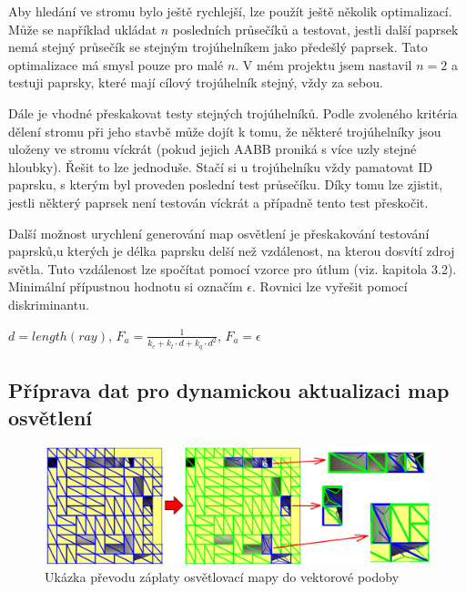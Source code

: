 \documentclass[11pt,twoside,a4paper]{book}
\begin{document}
Aby hledání ve stromu bylo ještě rychlejší, lze použít ještě několik optimalizací. Může se například ukládat $n$ posledních průsečíků a testovat, jestli další paprsek nemá stejný průsečík se stejným trojúhelníkem jako předešlý paprsek. Tato optimalizace má smysl pouze pro malé $n$. V mém projektu jsem nastavil $n = 2$ a testuji paprsky, které mají cílový trojúhelník stejný, vždy za sebou.

Dále je vhodné přeskakovat testy stejných trojúhelníků. Podle zvoleného kritéria dělení stromu při jeho stavbě může dojít k tomu, že některé trojúhelníky jsou uloženy ve stromu víckrát (pokud jejich AABB proniká s více uzly stejné hloubky). Řešit to lze jednoduše. Stačí si u trojúhelníku vždy pamatovat ID paprsku, s kterým byl proveden poslední test průsečíku. Díky tomu lze zjistit, jestli některý paprsek není testován víckrát a případně tento test přeskočit.

Další možnost urychlení generování map osvětlení je přeskakování testování paprsků,\linebreak u kterých je délka paprsku delší než vzdálenost, na kterou dosvítí zdroj světla. Tuto vzdálenost lze spočítat pomocí vzorce pro útlum (viz. kapitola 3.2). Minimální přípustnou hodnotu si označím $\epsilon$. Rovnici lze vyřešit pomocí diskriminantu.
\begin{center}
$d = length(ray)$, $F_a = \frac{1}{k_c + k_l \cdot d + k_q \cdot d^2}$, $F_a = \epsilon$
\end{center}


\subsection{Příprava dat pro dynamickou aktualizaci map osvětlení}

\begin{center}
\begin{figure}[h]
\includegraphics[width=150mm]{figures/lmpatch.png}
\caption{Ukázka převodu záplaty osvětlovací mapy do vektorové podoby }
\end{figure}
\end{center}
\end{document}
